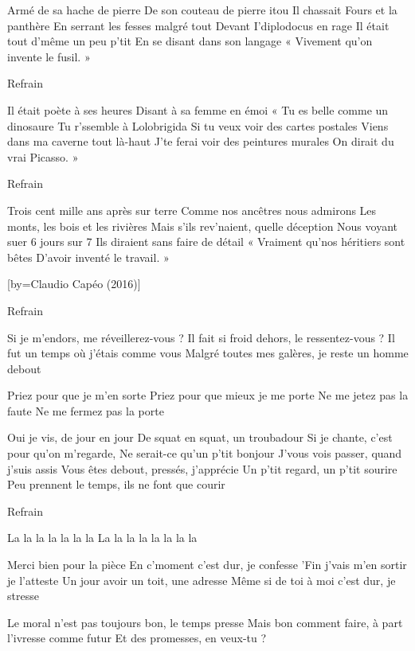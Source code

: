 \beginverse
Armé de sa hache de pierre
De son couteau de pierre itou
Il chassait Fours et la panthère
En serrant les fesses malgré tout
Devant I'diplodocus en rage
Il était tout d'même un peu p'tit
En se disant dans son langage
« Vivement qu'on invente le fusil. »
\endverse

\beginverse
Refrain
\endverse

\beginverse
Il était poète à ses heures
Disant à sa femme en émoi
« Tu es belle comme un dinosaure
Tu r'ssemble à Lolobrigida
Si tu veux voir des cartes postales
Viens dans ma caverne tout là-haut
J'te ferai voir des peintures murales
On dirait du vrai Picasso. »
\endverse

\beginverse
Refrain
\endverse

\beginverse
Trois cent mille ans après sur terre
Comme nos ancêtres nous admirons
Les monts, les bois et les rivières
Mais s'ils rev'naient, quelle déception
Nous voyant suer 6 jours sur 7
Ils diraient sans faire de détail
« Vraiment qu'nos héritiers sont bêtes
D'avoir inventé le travail. »
\endverse

[by={Claudio Capéo (2016)}]

\beginverse
Refrain
\endverse

\beginverse
Si je m'endors, me réveillerez-vous ?
Il fait si froid dehors, le ressentez-vous ?
Il fut un temps où j'étais comme vous
Malgré toutes mes galères, je reste un homme debout
\endverse

\beginverse
Priez pour que je m'en sorte
Priez pour que mieux je me porte
Ne me jetez pas la faute
Ne me fermez pas la porte
\endverse

\beginverse
Oui je vis, de jour en jour
De squat en squat, un troubadour
Si je chante, c'est pour qu'on m'regarde,
Ne serait-ce qu'un p'tit bonjour
J'vous vois passer, quand j'suis assis
Vous êtes debout, pressés, j'apprécie
Un p'tit regard, un p'tit sourire
Peu prennent le temps, ils ne font que courir
\endverse

\beginverse
Refrain
\endverse

\beginverse
La la la la la la la
La la la la la la la la
\endverse

\beginverse
Merci bien pour la pièce
En c'moment c'est dur, je confesse
'Fin j'vais m'en sortir je l'atteste
Un jour avoir un toit, une adresse
Même si de toi à moi c'est dur, je stresse
\endverse

\beginverse
Le moral n'est pas toujours bon, le temps presse
Mais bon comment faire, à part l'ivresse comme futur
Et des promesses, en veux-tu ?
\endverse

